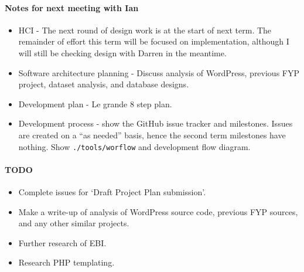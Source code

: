 \paragraph{Notes for next meeting with Ian}
\begin{itemize}
\item HCI - The next round of design work is at the start of next term. The
  remainder of effort this term will be focused on implementation, although I
  will still be checking design with Darren in the meantime.
\item Software architecture planning - Discuss analysis of WordPress, previous
  FYP project, dataset analysis, and database designs.
\item Development plan - Le grande 8 step plan.
\item Development process - show the GitHub issue tracker and milestones. Issues
  are created on a ``as needed'' basis, hence the second term milestones have
  nothing. Show \texttt{./tools/worflow} and development flow diagram.
\end{itemize}

\paragraph{TODO}
\begin{itemize}
\item Complete issues for `Draft Project Plan submission'.
\item Make a write-up of analysis of WordPress source code, previous FYP
  sources, and any other similar projects.
\item Further research of EBI.
\item Research PHP templating.
\end{itemize}

